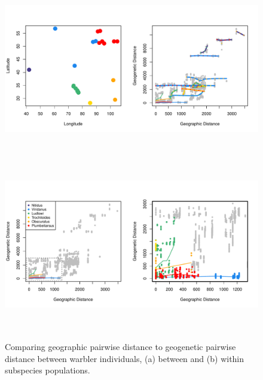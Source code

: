 \documentclass[10pt,letterpaper]{article}
\begin{document}
\clearpage

\begin{figure}
	\centering
			{\includegraphics[width=6in,height=3in]{../figs/warblers/warb_ind_dist_compare_allpairs.pdf}}
			{\includegraphics[width=6in,height=3in]{../figs/warblers/warb_ind_dist_compare.pdf}}
	\caption{Comparing geographic pairwise distance to geogenetic pairwise distance between warbler individuals, (a) between and (b) within subspecies populations.}\label{sfig:warb_ind_distcomp}
\end{figure}

\clearpage
\end{document}
